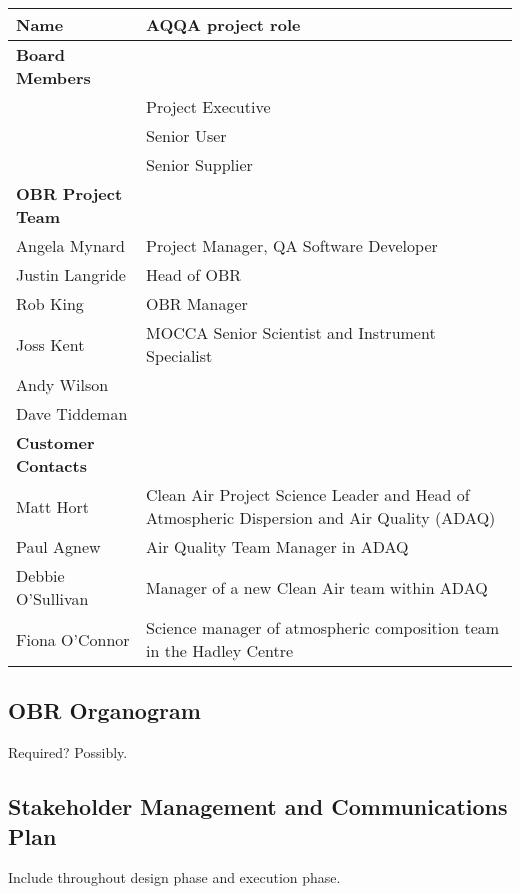 \documentclass[11pt]{article} %
\begin{document}
\begin{tabular}{|p{6cm}|p{9cm}|}
\hline
\textbf{Name} & \textbf{AQQA project role} \\ \hline

\textbf{Board Members} & \\ \hline
 & Project Executive \\ \hline
 & Senior User \\ \hline
 & Senior Supplier \\ \hline

\textbf{OBR Project Team} & \\ \hline
Angela Mynard & Project Manager, QA Software Developer \\ \hline
Justin Langride & Head of OBR \\ \hline
Rob King & OBR Manager  \\ \hline
Joss Kent & MOCCA Senior Scientist and Instrument Specialist  \\ \hline
Andy Wilson & \\ \hline
Dave Tiddeman & \\ \hline

\textbf{Customer Contacts} & \\ \hline
Matt Hort & Clean Air Project Science Leader and Head of Atmospheric Dispersion and Air Quality (ADAQ) \\ \hline
Paul Agnew & Air Quality Team Manager in ADAQ\\ \hline
Debbie O’Sullivan & Manager of a new Clean Air team within ADAQ \\ \hline
Fiona O’Connor & Science manager of atmospheric composition team in the Hadley Centre \\ \hline
\end{tabular}

\subsection{OBR Organogram}

Required? Possibly.

\subsection{Stakeholder Management and Communications Plan}
Include throughout design phase and execution phase.

\newpage
\end{document}
